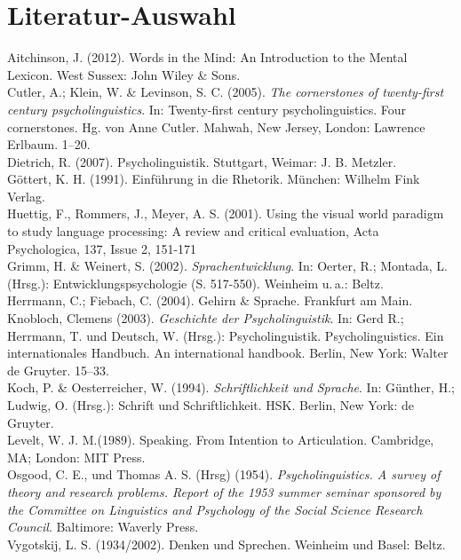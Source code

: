 \documentclass[11pt]{book}
\begin{document}
\section{Literatur-Auswahl}
Aitchinson, J. (2012). Words in the Mind: An Introduction to the Mental Lexicon. West Sussex: John Wiley \& Sons. \newline\\
Cutler, A.; Klein, W. \& Levinson, S. C. (2005). \textit{The cornerstones of twenty-first century psycholinguistics}. In: Twenty-first century psycholinguistics. Four cornerstones. Hg. von Anne Cutler.  Mahwah, New Jersey, London: Lawrence Erlbaum. 1–20.\newline\\
Dietrich, R. (2007). Psycholinguistik. Stuttgart, Weimar: J. B. Metzler.\newline\\
Göttert, K. H. (1991). Einführung in die Rhetorik. München: Wilhelm Fink Verlag.\newline\\
Huettig, F., Rommers, J., Meyer, A. S. (2001). Using the visual world paradigm to study language processing: A review and critical evaluation, Acta Psychologica, 137, Issue 2, 151-171\newline\\
Grimm, H. \& Weinert, S. (2002). \textit{Sprachentwicklung}. In: Oerter, R.; Montada, L. (Hrsg.): Entwicklungspsychologie (S. 517-550). Weinheim u.\,a.: Beltz.\newline\\
Herrmann, C.; Fiebach, C. (2004). Gehirn \& Sprache. Frankfurt am Main.\newline\\
Knobloch, Clemens (2003). \textit{Geschichte der Psycholinguistik}. In: Gerd R.; Herrmann, T. und Deutsch, W. (Hrsg.): Psycholinguistik. Psycholinguistics. Ein internationales Handbuch. An international handbook. Berlin, New York: Walter de Gruyter. 15–33.\newline\\
Koch, P. \& Oesterreicher, W. (1994). \textit{Schriftlichkeit und Sprache}. In: Günther, H.; Ludwig, O. (Hrsg.): Schrift und Schriftlichkeit. HSK. Berlin, New York: de Gruyter.\newline\\
Levelt, W. J. M.(1989). Speaking. From Intention to Articulation. Cambridge, MA; London: MIT Press.\newline\\
Osgood, C. E., und Thomas A. S. (Hrsg) (1954). \textit{Psycholinguistics. A survey of theory and research problems. Report of the 1953 summer seminar sponsored by the Committee on Linguistics and Psychology of the Social Science Research Council}. Baltimore: Waverly Press.\newline\\
Vygotskij, L. S. (1934/2002). Denken und Sprechen. Weinheim und Basel: Beltz.\newline\\
\end{document}
